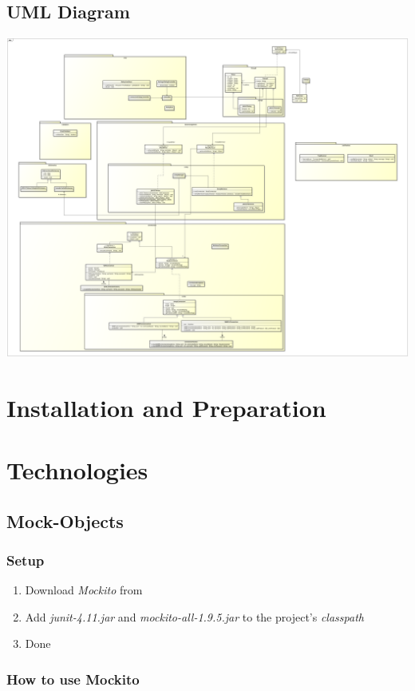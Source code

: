 \documentclass[11pt, a4paper]{article}
\begin{document}
\subsection{UML Diagram}
\includegraphics[width=\textwidth]{images/umlv3}


\section{Installation and Preparation}

\section{Technologies}
\subsection{Mock-Objects}
\subsubsection{Setup}

\begin{enumerate}
	\item Download \textit{Mockito} from \cite{MockitoDownload}
	\item Add \textit{junit-4.11.jar} and \textit{mockito-all-1.9.5.jar} to the project's \textit{classpath}
	\item Done
\end{enumerate}

\subsubsection{How to use Mockito}
\end{document}
